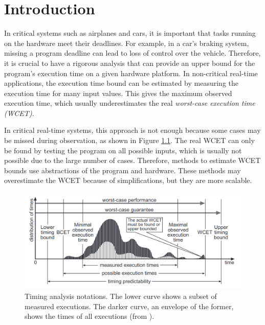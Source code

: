 \chapter{Introduction}


In critical systems such as airplanes and cars, it is important that tasks running on the hardware meet their deadlines. For example, in a car's braking system, missing a program deadline can lead to loss of control over the vehicle. Therefore, it is crucial to have a rigorous analysis that can provide an upper bound for the program's execution time on a given hardware platform. In non-critical real-time applications, the execution time bound can be estimated by measuring the execution time for many input values. This gives the maximum observed execution time, which usually underestimates the real \textit{worst-case execution time (WCET)}.

In critical real-time systems, this approach is not enough because some cases may be missed during observation, as shown in Figure \ref{fig:timing-distribution}. The real WCET can only be found by testing the program on all possible inputs, which is usually not possible due to the large number of cases. Therefore, methods to estimate WCET bounds use abstractions of the program and hardware. These methods may overestimate the WCET because of simplifications, but they are more scalable.

\begin{figure}[H]
    \centering
    \includegraphics[width=\textwidth]{figures/timing-distribution.png}
    \caption{Timing analysis notations. The lower curve shows a subset of measured executions. The darker curve, an envelope of the former, shows the times of all executions (from \cite{ferdinand_worst_2004}).}
    \label{fig:timing-distribution}
\end{figure}

